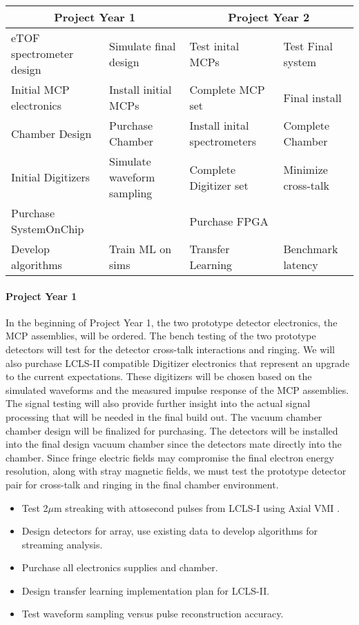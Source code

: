 \small
\begin{tabular}{l|l|l|l}
\hline
\multicolumn{2}{c|}{Project Year 1} &  \multicolumn{2}{c}{Project Year 2} \\
\hline
eTOF spectrometer design & Simulate final design & Test inital MCPs & Test Final system\\
Initial MCP electronics & Install initial MCPs & Complete MCP set & Final install\\
Chamber Design & Purchase Chamber& Install inital spectrometers & Complete Chamber\\
Initial Digitizers & Simulate waveform sampling& Complete Digitizer set & Minimize cross-talk\\
\hline
Purchase SystemOnChip & & Purchase FPGA &\\
Develop algorithms& Train ML on sims & Transfer Learning & Benchmark latency\\
\hline
\end{tabular}
\normalsize

\paragraph*{Project Year 1}
In the beginning of Project Year 1, the two prototype detector electronics, the MCP assemblies, will be ordered.
The bench testing of the two prototype detectors will test for the detector cross-talk interactions and ringing.
We will also purchase LCLS-II compatible Digitizer electronics that represent an upgrade to the current expectations.
These digitizers will be chosen based on the simulated waveforms and the measured impulse response of the MCP assemblies.
The signal testing will also provide further insight into the actual signal processing that will be needed in the final build out.  
The vacuum chamber chamber design will be finalized for purchasing. 
The detectors will be installed into the final design vacuum chamber since the detectors mate directly into the chamber.  
Since fringe electric fields may compromise the final electron energy resolution, along with stray magnetic fields, we must test the prototype detector pair for cross-talk and ringing in the final chamber environment.  
\begin{itemize}
\item Test 2$\mu$m streaking with attosecond pulses from LCLS-I using Axial VMI \cite{Siqi2018}.
\item Design detectors for array, use existing data to develop algorithms for streaming analysis.
\item Purchase all electronics supplies and chamber.
\item Design transfer learning implementation plan for LCLS-II.
\item Test waveform sampling versus pulse reconstruction accuracy.
\end{itemize}

